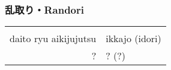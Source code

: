 \subsubsection{乱取り・Randori}
\begin{table}[H]
\begin{center}
\begin{tabular}{rl}
    \ruby{}{}\ruby{}{} & \\
    daito ryu aikijujutsu & ikkajo (idori)\\
    ? & ? (?)
\end{tabular}
\end{center}
\label{kyuu_4_randori}
\end{table}
